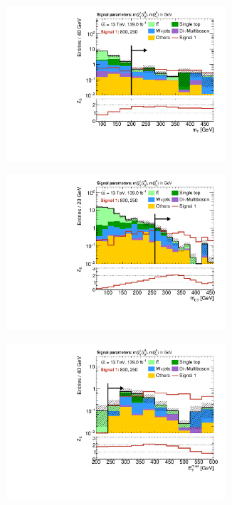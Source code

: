 \begin{figure}
	\centering
	\begin{subfigure}[b]{0.5\linewidth}
		\centering\includegraphics[width=0.9\textwidth]{N-1_cut_scan/n1_800_250/mt}
	\end{subfigure}\hfill
	\begin{subfigure}[b]{0.5\linewidth}
		\centering\includegraphics[width=0.9\textwidth]{N-1_cut_scan/n1_800_250/mct}
	\end{subfigure}\hfill
	\begin{subfigure}[b]{0.5\linewidth}
		\centering\includegraphics[width=0.9\textwidth]{N-1_cut_scan/n1_800_250/met}

\end{subfigure}
\end{figure}
